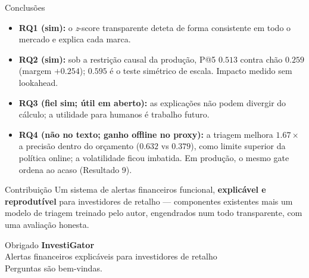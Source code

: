 \documentclass[aspectratio=169]{beamer}
\begin{document}
\begin{frame}{Conclusões}
\begin{itemize}
  \item \textbf{RQ1 (sim):} o \emph{z}-score transparente deteta de forma consistente em todo o mercado e explica cada marca.
  \item \textbf{RQ2 (sim):} sob a restrição causal da produção, P@5 $0.513$ contra chão $0.259$ (margem $+0.254$); $0.595$ é o teste simétrico de escala. Impacto medido sem lookahead.
  \item \textbf{RQ3 (fiel sim; útil em aberto):} as explicações não podem divergir do cálculo; a utilidade para humanos é trabalho futuro.
  \item \textbf{RQ4 (não no texto; ganho offline no proxy):} a triagem melhora $1.67\times$ a precisão dentro do orçamento ($0.632$ vs $0.379$), como limite superior da política online; a volatilidade ficou imbatida. Em produção, o mesmo gate ordena ao acaso (Resultado 9).
\end{itemize}
\vfill
\begin{block}{Contribuição}
Um sistema de alertas financeiros funcional, \textbf{explicável e reprodutível} para investidores de retalho --- componentes existentes mais um modelo de triagem treinado pelo autor, engendrados num todo transparente, com uma avaliação honesta.
\end{block}
\end{frame}

\begin{frame}{Obrigado}
\vfill
\centering
{\Huge \textbf{InvestiGator}} \\[4mm]
{\large Alertas financeiros explicáveis para investidores de retalho} \\[8mm]
{\footnotesize Perguntas são bem-vindas.}
\vfill
\end{frame}
\end{document}
